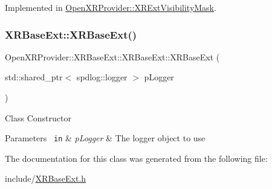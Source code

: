 Implemented in \mbox{\hyperlink{class_open_x_r_provider_1_1_x_r_ext_visibility_mask_a7560c4d28687a01f8b7ef80107d09b20}{Open\+X\+R\+Provider\+::\+X\+R\+Ext\+Visibility\+Mask}}.

\mbox{\label{class_open_x_r_provider_1_1_x_r_base_ext_a8f59e68df5f1773152a3dfbe9ddc17fc}} 
\subsubsection{\texorpdfstring{XRBaseExt::XRBaseExt()}{XRBaseExt::XRBaseExt()}}
{\footnotesize\ttfamily Open\+X\+R\+Provider\+::\+X\+R\+Base\+Ext\+::\+X\+R\+Base\+Ext\+::\+X\+R\+Base\+Ext (\begin{DoxyParamCaption}\item[{std\+::shared\+\_\+ptr$<$ spdlog\+::logger $>$}]{p\+Logger }\end{DoxyParamCaption})\hspace{0.3cm}{\ttfamily [inline]}}

Class Constructor 
\begin{DoxyParams}[1]{Parameters}
\mbox{\texttt{ in}}  & {\em p\+Logger} & The logger object to use \\
\hline
\end{DoxyParams}


The documentation for this class was generated from the following file\+:\begin{DoxyCompactItemize}
\item 
include/\mbox{\hyperlink{_x_r_base_ext_8h}{X\+R\+Base\+Ext.\+h}}\end{DoxyCompactItemize}
